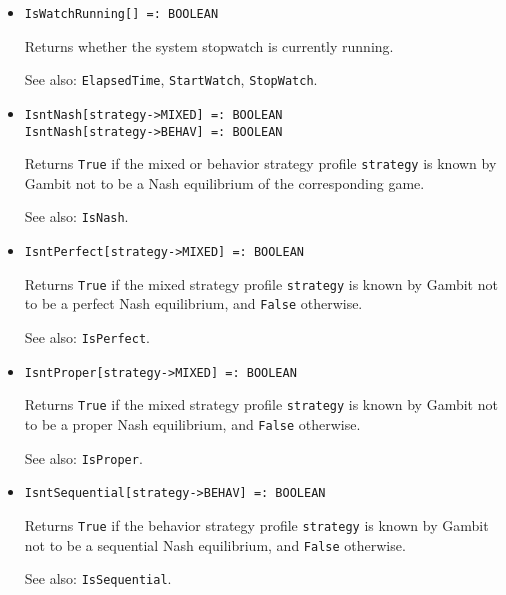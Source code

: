 \begin{itemize}
\item
\protect \large \begin{verbatim}
IsWatchRunning[] =: BOOLEAN
\end{verbatim}\normalsize

\bd
Returns whether the system stopwatch is currently running.
\item
[See also:] {\tt ElapsedTime}, {\tt StartWatch}, {\tt StopWatch}.
\ed

\item
\protect \large \begin{verbatim}
IsntNash[strategy->MIXED] =: BOOLEAN
IsntNash[strategy->BEHAV] =: BOOLEAN
\end{verbatim}\normalsize

\bd Returns \verb+True+ if the mixed or behavior strategy profile
\verb+strategy+ is known by Gambit not to be a Nash equilibrium of the
corresponding game.  
\item
[See also:] {\tt IsNash}.
\ed

\item
\protect \large \begin{verbatim}
IsntPerfect[strategy->MIXED] =: BOOLEAN
\end{verbatim}\normalsize

\bd Returns \verb+True+ if the mixed strategy profile \verb+strategy+
is known by Gambit not to be a perfect Nash equilibrium, and \verb+False+
otherwise.  
\item
[See also:] {\tt IsPerfect}.
\ed

\item
\protect \large \begin{verbatim}
IsntProper[strategy->MIXED] =: BOOLEAN
\end{verbatim}\normalsize

\bd Returns \verb+True+ if the mixed strategy profile \verb+strategy+
is known by Gambit not to be a proper Nash equilibrium, and \verb+False+
otherwise.  
\item
[See also:] {\tt IsProper}.
\ed

\item
\protect \large \begin{verbatim}
IsntSequential[strategy->BEHAV] =: BOOLEAN
\end{verbatim}\normalsize

\bd Returns \verb+True+ if the behavior strategy profile
\verb+strategy+ is known by Gambit not to be a sequential Nash
equilibrium, and \verb+False+ otherwise. 
\item
[See also:] {\tt IsSequential}.
\ed


\end{itemize}
